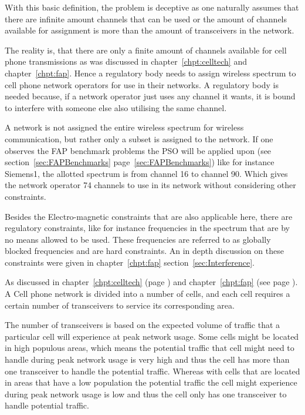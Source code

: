 With this basic definition, the problem is deceptive as one naturally assumes that there are infinite amount channels that can be used or the amount of channels available for assignment is more than the amount of transceivers in the network. 

The reality is, that there are only a finite amount of channels available for cell phone transmissions as was discussed in chapter~\ref{chpt:celltech} and chapter~\ref{chpt:fap}. Hence a regulatory body needs to assign wireless spectrum to cell phone network operators for use in their networks. A regulatory body is needed because, if a network operator just uses any channel it wants, it is bound to interfere with someone else also utilising the same channel.

A network is not assigned the entire wireless spectrum for wireless communication, but rather only a subset is assigned to the network. If one observes the FAP benchmark problems the PSO will be applied upon (see section~\ref{sec:FAPBenchmarks} page~\ref{sec:FAPBenchmarks}) like for instance Siemens1, the allotted spectrum is from channel 16 to channel 90. Which gives the network operator 74 channels to use in its network without considering other constraints. 

Besides the Electro-magnetic constraints that are also applicable here, there are regulatory constraints, like for instance frequencies in the spectrum that are by no means allowed to be used. These frequencies are referred to as globally blocked frequencies and are hard constraints. An in depth discussion on these constraints were given in chapter~\ref{chpt:fap} section~\ref{sec:Interference}.

As discussed in chapter~\ref{chpt:celltech} (page \pageref{chpt:celltech}) and chapter~\ref{chpt:fap} (see page \pageref{chpt:fap}). A Cell phone network is divided into a number of cells, and each cell requires a certain number of transceivers to service its corresponding area. 

The number of transceivers is based on the expected volume of traffic that a particular cell will experience at peak network usage. Some cells might be located in high populous areas, which means the potential traffic that cell might need to handle during peak network usage is very high and thus the cell has more than one transceiver to handle the potential traffic. Whereas with cells that are located in areas that have a low population the potential traffic the cell might experience during peak network usage is low and thus the cell only has one transceiver to handle potential traffic.

